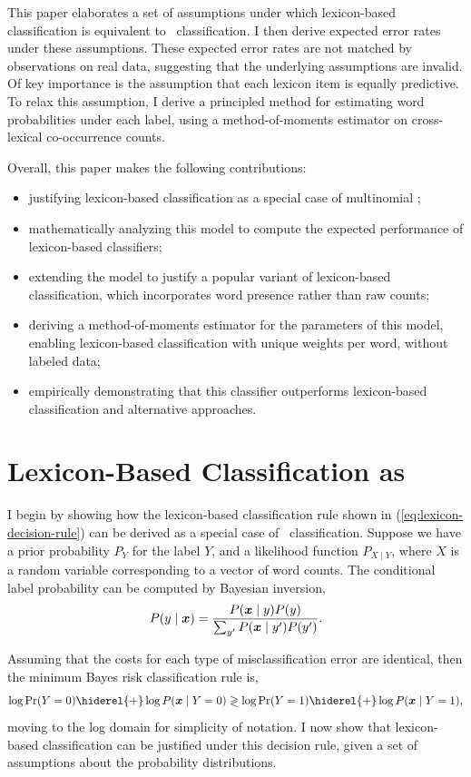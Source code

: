 This paper elaborates a set of assumptions under which lexicon-based classification is equivalent to \nb\ classification. I then derive expected error rates under these assumptions. These expected error rates are not matched by observations on real data, suggesting that the underlying assumptions are invalid. Of key importance is the assumption that each lexicon item is equally predictive. To relax this assumption, I derive a principled method for estimating word probabilities under each label, using a method-of-moments estimator on cross-lexical co-occurrence counts. 

Overall, this paper makes the following contributions:
\begin{itemize}
\item justifying lexicon-based classification as a special case of multinomial \nb;
\item mathematically analyzing this model to compute the expected performance of lexicon-based classifiers;
\item extending the model to justify a popular variant of lexicon-based classification, which incorporates word presence rather than raw counts;
\item deriving a method-of-moments estimator for the parameters of this model, enabling lexicon-based classification with unique weights per word, without labeled data;
\item empirically demonstrating that this classifier outperforms lexicon-based classification and alternative approaches.
\end{itemize}

\section{Lexicon-Based Classification as \nb}
I begin by showing how the lexicon-based classification rule shown in (\ref{eq:lexicon-decision-rule}) can be derived as a special case of \nb\ classification. Suppose we have a prior probability $P_Y$ for the label $Y$, and a likelihood function $P_{X \mid Y}$, where $X$ is a random variable corresponding to a vector of word counts. The conditional label probability can be computed by Bayesian inversion,
\begin{dmath}
P(y \mid \vx) = \frac{P(\vx \mid y) P(y)}{\sum_{y'} P(\vx \mid y')P(y')}.
\end{dmath}

Assuming that the costs for each type of misclassification error are identical, then the minimum Bayes risk classification rule is,
\begin{dmath}
  \label{eq:basic-decision-rule}
  \log \Pr(Y=0) \hiderel{+} \log P(\vx \mid Y=0)\\ \gtrless \log \Pr(Y=1) \hiderel{+} \log P(\vx \mid Y=1),
\end{dmath}
moving to the log domain for simplicity of notation. I now show that lexicon-based classification can be justified under this decision rule, given a set of assumptions about the probability distributions. 


